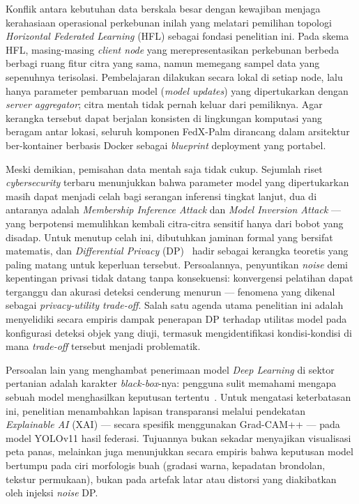 Konflik antara kebutuhan data berskala besar dengan kewajiban menjaga kerahasiaan operasional perkebunan inilah yang melatari pemilihan topologi \emph{Horizontal Federated Learning} (HFL) sebagai fondasi penelitian ini. Pada skema HFL, masing-masing \emph{client node} yang merepresentasikan perkebunan berbeda berbagi ruang fitur citra yang sama, namun memegang sampel data yang sepenuhnya terisolasi. Pembelajaran dilakukan secara lokal di setiap node, lalu hanya parameter pembaruan model (\emph{model updates}) yang dipertukarkan dengan \emph{server aggregator}; citra mentah tidak pernah keluar dari pemiliknya. Agar kerangka tersebut dapat berjalan konsisten di lingkungan komputasi yang beragam antar lokasi, seluruh komponen FedX-Palm dirancang dalam arsitektur ber-kontainer berbasis Docker sebagai \emph{blueprint} deployment yang portabel.

Meski demikian, pemisahan data mentah saja tidak cukup. Sejumlah riset \emph{cybersecurity} terbaru menunjukkan bahwa parameter model yang dipertukarkan masih dapat menjadi celah bagi serangan inferensi tingkat lanjut, dua di antaranya adalah \emph{Membership Inference Attack} dan \emph{Model Inversion Attack} --- yang berpotensi memulihkan kembali citra-citra sensitif hanya dari bobot yang disadap. Untuk menutup celah ini, dibutuhkan jaminan formal yang bersifat matematis, dan \emph{Differential Privacy} (DP)~\cite{dwork2014differential} hadir sebagai kerangka teoretis yang paling matang untuk keperluan tersebut. Persoalannya, penyuntikan \emph{noise} demi kepentingan privasi tidak datang tanpa konsekuensi: konvergensi pelatihan dapat terganggu dan akurasi deteksi cenderung menurun --- fenomena yang dikenal sebagai \emph{privacy-utility trade-off}. Salah satu agenda utama penelitian ini adalah menyelidiki secara empiris dampak penerapan DP terhadap utilitas model pada konfigurasi deteksi objek yang diuji, termasuk mengidentifikasi kondisi-kondisi di mana \emph{trade-off} tersebut menjadi problematik.

Persoalan lain yang menghambat penerimaan model \emph{Deep Learning} di sektor pertanian adalah karakter \emph{black-box}-nya: pengguna sulit memahami mengapa sebuah model menghasilkan keputusan tertentu~\cite{carvalho2019machine}. Untuk mengatasi keterbatasan ini, penelitian menambahkan lapisan transparansi melalui pendekatan \emph{Explainable AI} (XAI) --- secara spesifik menggunakan Grad-CAM++ --- pada model YOLOv11 hasil federasi. Tujuannya bukan sekadar menyajikan visualisasi peta panas, melainkan juga menunjukkan secara empiris bahwa keputusan model bertumpu pada ciri morfologis buah (gradasi warna, kepadatan brondolan, tekstur permukaan), bukan pada artefak latar atau distorsi yang diakibatkan oleh injeksi \emph{noise} DP.

